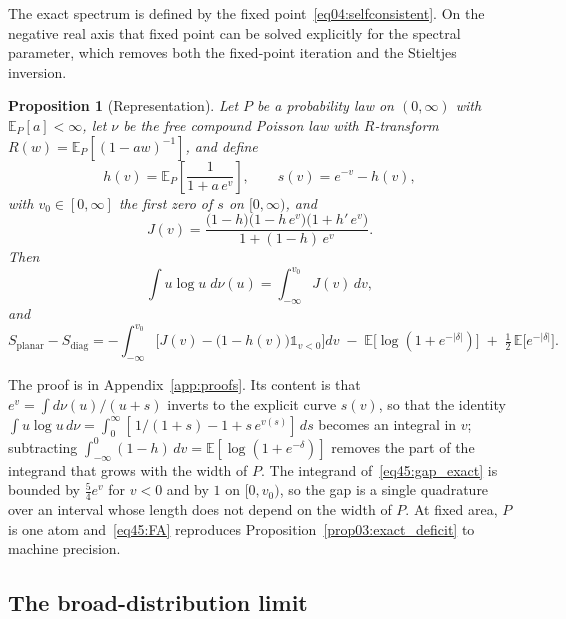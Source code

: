 \documentclass[11pt,letterpaper]{article}
\theoremstyle{plain}
\newtheorem{proposition}[theorem]{Proposition}
\theoremstyle{definition}
\theoremstyle{remark}
\begin{document}
The exact spectrum is defined by the fixed point~\eqref{eq04:selfconsistent}. On the negative real axis that fixed point can be solved explicitly for the spectral parameter, which removes both the fixed-point iteration and the Stieltjes inversion.

\begin{proposition}[Representation]
\label{thm45:representation}
Let $P$ be a probability law on $(0,\infty)$ with $\mathbb{E}_P[a] < \infty$, let $\nu$ be the free compound Poisson law with $R$-transform $R(w) = \mathbb{E}_P[(1 - a w)^{-1}]$, and define
\begin{equation}
\label{eq45:h_s}
h(v) = \mathbb{E}_P\!\left[\frac{1}{1 + a\, e^{v}}\right], \qquad s(v) = e^{-v} - h(v),
\end{equation}
with $v_0 \in [0,\infty]$ the first zero of $s$ on $[0,\infty)$, and
\begin{equation}
\label{eq45:J}
J(v) = \frac{\big(1 - h\big)\big(1 - h\, e^{v}\big)\big(1 + h'\, e^{v}\big)}{1 + (1 - h)\, e^{v}} .
\end{equation}
Then
\begin{equation}
\label{eq45:FA}
\int u \log u\; d\nu(u) = \int_{-\infty}^{v_0} J(v)\, dv ,
\end{equation}
and
\begin{equation}
\label{eq45:gap_exact}
S_{\mathrm{planar}} - S_{\mathrm{diag}} = -\int_{-\infty}^{v_0} \Big[ J(v) - \big(1 - h(v)\big)\mathbb{1}_{v<0} \Big] dv \;-\; \mathbb{E}\big[\log(1 + e^{-|\delta|})\big] \;+\; \tfrac12\, \mathbb{E}\big[e^{-|\delta|}\big] .
\end{equation}
\end{proposition}

The proof is in Appendix~\ref{app:proofs}. Its content is that $e^{v} = \int d\nu(u)/(u + s)$ inverts to the explicit curve $s(v)$, so that the identity $\int u\log u\, d\nu = \int_0^\infty [\,1/(1+s) - 1 + s\, e^{v(s)}]\, ds$ becomes an integral in $v$; subtracting $\int_{-\infty}^0 (1-h)\, dv = \mathbb{E}[\log(1 + e^{-\delta})]$ removes the part of the integrand that grows with the width of $P$. The integrand of~\eqref{eq45:gap_exact} is bounded by $\tfrac54 e^{v}$ for $v < 0$ and by $1$ on $[0, v_0)$, so the gap is a single quadrature over an interval whose length does not depend on the width of $P$. At fixed area, $P$ is one atom and~\eqref{eq45:FA} reproduces Proposition~\ref{prop03:exact_deficit} to machine precision.

\subsection{The broad-distribution limit}
\label{subsec45:theorem}
\end{document}
